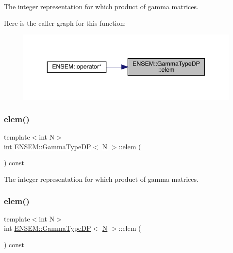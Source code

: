 The integer representation for which product of gamma matrices. 

Here is the caller graph for this function\+:
\nopagebreak
\begin{figure}[H]
\begin{center}
\leavevmode
\includegraphics[width=343pt]{d4/d0d/classENSEM_1_1GammaTypeDP_a0d7ad0581feda4578c3ee7631ce730e2_icgraph}
\end{center}
\end{figure}
\mbox{\label{classENSEM_1_1GammaTypeDP_a0d7ad0581feda4578c3ee7631ce730e2}} 
\subsubsection{\texorpdfstring{elem()}{elem()}\hspace{0.1cm}{\footnotesize\ttfamily [2/3]}}
{\footnotesize\ttfamily template$<$int N$>$ \\
int \mbox{\hyperlink{classENSEM_1_1GammaTypeDP}{E\+N\+S\+E\+M\+::\+Gamma\+Type\+DP}}$<$ \mbox{\hyperlink{adat__devel_2lib_2hadron_2operator__name__util_8cc_a7722c8ecbb62d99aee7ce68b1752f337}{N}} $>$\+::elem (\begin{DoxyParamCaption}{ }\end{DoxyParamCaption}) const\hspace{0.3cm}{\ttfamily [inline]}}



The integer representation for which product of gamma matrices. 

\mbox{\label{classENSEM_1_1GammaTypeDP_a0d7ad0581feda4578c3ee7631ce730e2}} 
\subsubsection{\texorpdfstring{elem()}{elem()}\hspace{0.1cm}{\footnotesize\ttfamily [3/3]}}
{\footnotesize\ttfamily template$<$int N$>$ \\
int \mbox{\hyperlink{classENSEM_1_1GammaTypeDP}{E\+N\+S\+E\+M\+::\+Gamma\+Type\+DP}}$<$ \mbox{\hyperlink{adat__devel_2lib_2hadron_2operator__name__util_8cc_a7722c8ecbb62d99aee7ce68b1752f337}{N}} $>$\+::elem (\begin{DoxyParamCaption}{ }\end{DoxyParamCaption}) const\hspace{0.3cm}{\ttfamily [inline]}}



